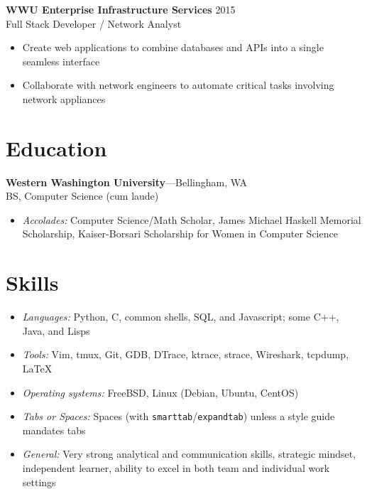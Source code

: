 \documentclass[11pt, letterpaper]{article}
\begin{document}
\textbf{WWU Enterprise Infrastructure Services} \hfill 2015\\
Full Stack Developer / Network Analyst

\begin{itemize}
    \item Create web applications to combine databases and APIs into a single seamless interface
    \item Collaborate with network engineers to automate critical tasks involving network appliances
\end{itemize}

\section*{Education}

\textbf{Western Washington University}---Bellingham, WA\\
BS, Computer Science (cum laude)

\begin{itemize}
    \item \textit{Accolades:} Computer Science/Math Scholar, James Michael Haskell Memorial Scholarship, Kaiser-Borsari Scholarship for Women in Computer Science
\end{itemize}

\section*{Skills}
\setlength{\parskip}{11pt}

\raggedright
\begin{itemize}
    \item \textit{Languages:} Python, C, common shells, SQL, and Javascript; some C++, Java, and Lisps
    \item \textit{Tools:} Vim, tmux, Git, GDB, DTrace, ktrace, strace, Wireshark, tcpdump, \LaTeX
    \item \textit{Operating systems:} FreeBSD, Linux (Debian, Ubuntu, CentOS)
    \item \textit{Tabs or Spaces:} Spaces (with {\tt smarttab}/{\tt expandtab}) unless a style guide mandates tabs
    \item \textit{General:} Very strong analytical and communication skills, strategic mindset, independent learner, ability to excel in both team and individual work settings
\end{itemize}
\end{document}
